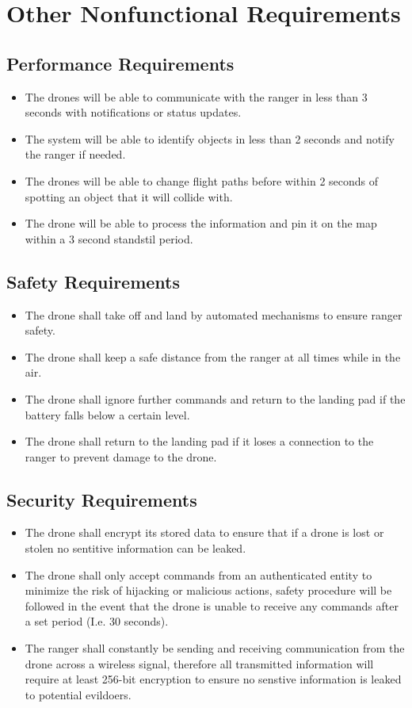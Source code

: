 \chapter{Other Nonfunctional Requirements}

\section{Performance Requirements}
\begin{itemize}
	\item The drones will be able to communicate with the ranger in less than 3 seconds with notifications or status updates.
	\item The system will be able to identify objects in less than 2 seconds and notify the ranger if needed.
	\item The drones will be able to change flight paths before within 2 seconds of spotting an object that it will collide with.
	\item The drone will be able to process the information and pin it on the map within a 3 second standstil period.
\end{itemize}

\section{Safety Requirements}
\begin{itemize}
	\item The drone shall take off and land by automated mechanisms to ensure ranger safety.
	\item The drone shall keep a safe distance from the ranger at all times while in the air.
	\item The drone shall ignore further commands and return to the landing pad if the battery falls below a certain level.
	\item The drone shall return to the landing pad if it loses a connection to the ranger to prevent damage to the drone.
\end{itemize}

\section{Security Requirements}
\begin{itemize}
	\item The drone shall encrypt its stored data to ensure that if a drone is lost or stolen no sentitive information can be leaked.
	\item The drone shall only accept commands from an authenticated entity to minimize the risk of hijacking or malicious actions, safety procedure will be followed in the event that the drone is unable to receive any commands after a set period (I.e. 30 seconds).
	\item The ranger shall constantly be sending and receiving communication from the drone across a wireless signal, therefore all transmitted information will require at least 256-bit encryption to ensure no senstive information is leaked to potential evildoers.
\end{itemize}

